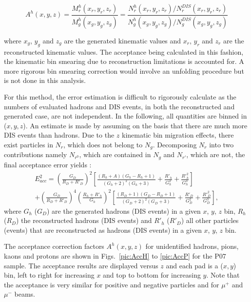 \begin{equation}
  A^h(x,y,z) = \frac{M^h_r(x_r,y_r,z_r)}{M^h_g(x_g,y_g,z_g)}=\frac{N^h_r(x_r,y_r,z_r)/N^{DIS}_r(x_r,y_r,z_r)}{N^h_g(x_g,y_g,z_g)/N^{DIS}_g(x_g,y_g,z_g)}
\end{equation}

where $x_g$, $y_g$ and $z_g$ are the generated kinematic values and $x_r$, $y_r$ and $z_r$ are the reconstructed kinematic values. The acceptance being calculated in this fashion, the kinematic bin smearing due to reconstruction limitations is accounted for. A more rigorous bin smearing correction would involve an unfolding procedure but is not done in this analysis.

For this method, the error estimation is difficult to rigorously calculate as the numbers of evaluated hadrons and DIS events, in both the reconstructed and generated case, are not independent. In the following, all quantities are binned in ($x,y,z$). An estimate is made by assuming on the basis that there are much more DIS events than hadrons. Due to the $z$ kinematic bin migration effects, there exist particles in $N_r$, which does not belong to $N_g$. Decomposing $N_r$ into two contributions namely $N_{r^0}$, which are contained in $N_g$ and $N_{r'}$, which are not, the final acceptance error yields :
%
\begin{equation}
  \begin{split}
    E^2_{acc} = \left (\frac{G_D}{R_D+R'_{D}}\right )^2\left [\frac{(R_h+A)(G_h-R_h+1)}{(G_h+2)^2(G_h+3)}+\frac{R'_{h}}{G^2_h}+\frac{R'^2_h}{G^3_h}\right ] \\
                + \left (\frac{G_D}{R_D+R'_{D}}\right )^4\left (\frac{R_h+R'_h}{G_h}\right )^2\left [\frac{(R_D+1)(G_D-R_D+1)}{(G_D+2)^2(G_D+3)}+\frac{R'_D}{G^2_D}+\frac{R'^2_D}{G^3_D}\right ],
  \end{split}
\end{equation}
%
where $G_h$ ($G_D$) are the generated hadrons (DIS events) in a given $x$, $y$, $z$ bin, $R_h$ ($R_D$) the reconstructed hadrons (DIS events) and $R'_h$ ($R'_D$) all other particles (events) that are reconstructed as hadrons (DIS events) in a given $x$, $y$, $z$ bin.

The acceptance correction factors $A^h(x,y,z)$ for unidentified hadrons, pions, kaons and protons are shown in Figs.~\ref{pic:AccH} to \ref{pic:AccP} for the P$07$ sample. The acceptance results are displayed versus $z$ and each pad is a ($x,y$) bin, left to right for increasing $x$ and top to bottom for increasing $y$. Note that the acceptance is very similar for positive and negative particles and for $\mu^+$ and $\mu^-$ beams.

